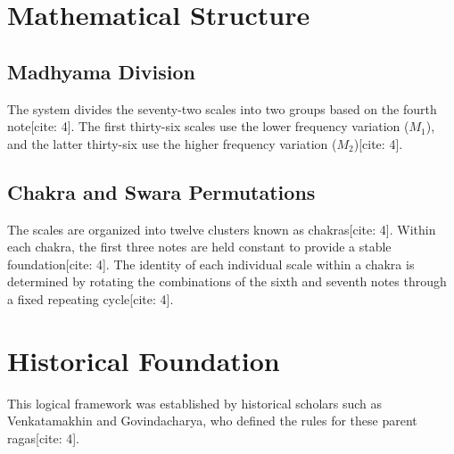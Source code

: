 \documentclass[11pt,a4paper]{article}
\begin{document}
\section{Mathematical Structure}

\subsection{Madhyama Division}
The system divides the seventy-two scales into two groups based on the fourth note[cite: 4]. The first thirty-six scales use the lower frequency variation ($M_1$), and the latter thirty-six use the higher frequency variation ($M_2$)[cite: 4].

\subsection{Chakra and Swara Permutations}
The scales are organized into twelve clusters known as chakras[cite: 4]. Within each chakra, the first three notes are held constant to provide a stable foundation[cite: 4]. The identity of each individual scale within a chakra is determined by rotating the combinations of the sixth and seventh notes through a fixed repeating cycle[cite: 4].

\section*{Historical Foundation}
This logical framework was established by historical scholars such as Venkatamakhin and Govindacharya, who defined the rules for these parent ragas[cite: 4].
\end{document}
